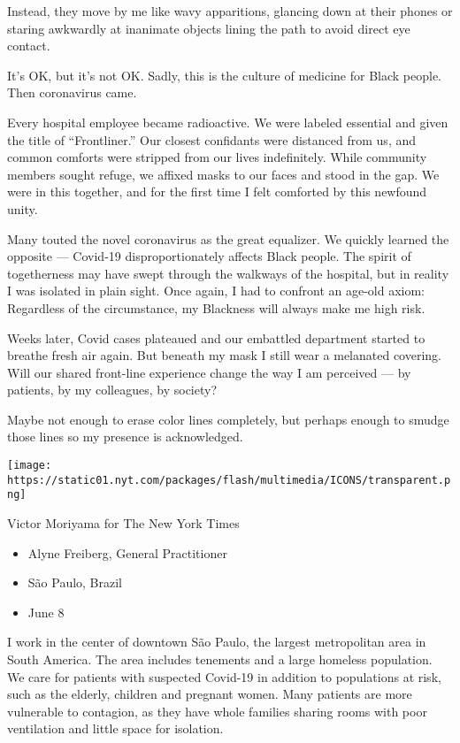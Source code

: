 Instead, they move by me like wavy apparitions, glancing down at their
phones or staring awkwardly at inanimate objects lining the path to
avoid direct eye contact.

It's OK, but it's not OK. Sadly, this is the culture of medicine for
Black people. Then coronavirus came.

Every hospital employee became radioactive. We were labeled essential
and given the title of ``Frontliner.'' Our closest confidants were
distanced from us, and common comforts were stripped from our lives
indefinitely. While community members sought refuge, we affixed masks to
our faces and stood in the gap. We were in this together, and for the
first time I felt comforted by this newfound unity.

Many touted the novel coronavirus as the great equalizer. We quickly
learned the opposite --- Covid-19 disproportionately affects Black
people. The spirit of togetherness may have swept through the walkways
of the hospital, but in reality I was isolated in plain sight. Once
again, I had to confront an age-old axiom: Regardless of the
circumstance, my Blackness will always make me high risk.

Weeks later, Covid cases plateaued and our embattled department started
to breathe fresh air again. But beneath my mask I still wear a melanated
covering. Will our shared front-line experience change the way I am
perceived --- by patients, by my colleagues, by society?

Maybe not enough to erase color lines completely, but perhaps enough to
smudge those lines so my presence is acknowledged.

\texttt{[image: https://static01.nyt.com/packages/flash/multimedia/ICONS/transparent.png]}

Victor Moriyama for The New York Times

\begin{itemize}
\tightlist
\item
  Alyne Freiberg, General Practitioner
\item
  São Paulo, Brazil
\item
  June 8
\end{itemize}

I work in the center of downtown São Paulo, the largest metropolitan
area in South America. The area includes tenements and a large homeless
population. We care for patients with suspected Covid-19 in addition to
populations at risk, such as the elderly, children and pregnant women.
Many patients are more vulnerable to contagion, as they have whole
families sharing rooms with poor ventilation and little space for
isolation.

